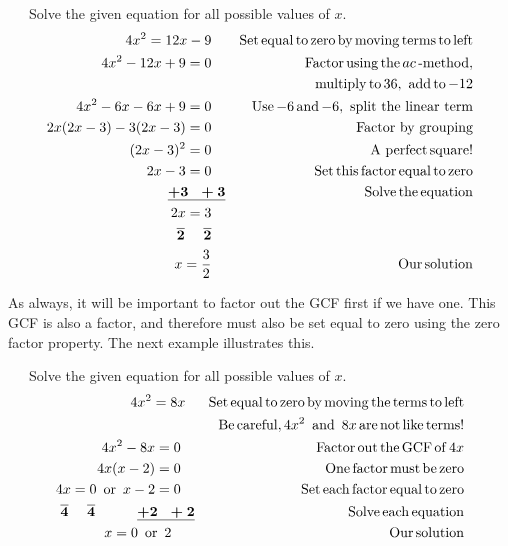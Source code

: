 \begin{example}~~~Solve the given equation for all possible values of $x$.
  \begin{eqnarray*}
    4 x^2 = 12 x - 9~~~ &  & \operatorname{Set} \operatorname{equal} \operatorname{to} \operatorname{zero}
    \operatorname{by} \operatorname{moving} \operatorname{terms} \operatorname{to} \operatorname{left}\\
    4 x^2 - 12 x + 9 = 0~~~ &  & \operatorname{Factor} \operatorname{using} \operatorname{the} ac
    \operatorname{-method},\\
		&& \operatorname{~~~multiply} \operatorname{to} 36, \operatorname{~add} \operatorname{to} - 12\\
		4 x^2 - 6 x -6x + 9 = 0~~~ &  & \operatorname{Use} - 6 \operatorname{and} - 6, \text{~split~the~linear~term}\\ 
    2x(2x-3)-3(2x-3)=0~~~ & & \text{Factor~by~grouping}\\
		(2 x - 3)^2 = 0~~~ &  & \operatorname{A~perfect} \operatorname{square}!\\
    2 x - 3 = 0~~~ &  & \operatorname{Set} \operatorname{this} \operatorname{factor} \operatorname{equal}
    \operatorname{to} \operatorname{zero}\\
    \boldsymbol{\underline{+ 3 ~~+ 3}} &  & \operatorname{Solve} \operatorname{the} \operatorname{equation}\\
    2 x = 3~~~ &  & \\
    \boldsymbol{\overline{2} ~~~~ \overline{2}}~~~ &  & \\
    x = \frac{3}{2}~~~ &  & \operatorname{Our} \operatorname{solution}
  \end{eqnarray*}
\end{example}
As always, it will be important to factor out the GCF first if we have one.
This GCF is also a factor, and therefore must also be set equal to zero using the zero
factor property.  The next example illustrates this.

\begin{example}~~~Solve the given equation for all possible values of $x$.
  \begin{eqnarray*}
    4 x^2 = 8 x~~ &  & \operatorname{Set} \operatorname{equal} \operatorname{to} \operatorname{zero} \operatorname{by}
    \operatorname{moving} \operatorname{the} \operatorname{terms} \operatorname{to} \operatorname{left}\\
 &  & \operatorname{Be} \operatorname{careful}, 4x^2 \operatorname{~and~} 8x \operatorname{are} \operatorname{not} \operatorname{like}
    \operatorname{terms} !\\
    4 x^2 - 8 x = 0~~~ &  & \operatorname{Factor} \operatorname{out} \operatorname{the} \operatorname{GCF}
    \operatorname{of} 4 x\\
    4 x (x - 2) = 0~~~ &  & \operatorname{One} \operatorname{factor} \operatorname{must} \operatorname{be}
    \operatorname{zero}\\
    4 x = 0 \operatorname{~or~} x - 2 = 0~~~ &  & \operatorname{Set} \operatorname{each} \operatorname{factor}
    \operatorname{equal} \operatorname{to} \operatorname{zero}\\
    \boldsymbol{\overline{4} ~~~~ \overline{4} ~~~~~~~~~ \underline{+ 2 ~~+ 2}} &  & \operatorname{Solve}
    \operatorname{each} \operatorname{equation}\\
    x = 0 \operatorname{~or~} 2~~~~~ &  & \operatorname{Our} \operatorname{solution}
  \end{eqnarray*}
\end{example}

